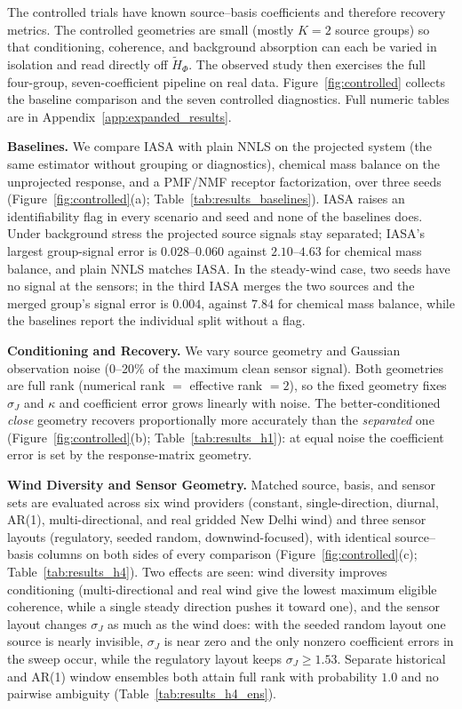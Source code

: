 The controlled trials have known source--basis coefficients and therefore recovery
metrics.  The controlled geometries are small (mostly
\(K=2\) source groups) so that conditioning, coherence, and background absorption
can each be varied in isolation and read directly off \(\widetilde H_\Phi\).  The
observed study then exercises the full four-group, seven-coefficient pipeline on
real data.  Figure~\ref{fig:controlled} collects the baseline comparison and the
seven controlled diagnostics.  Full numeric tables are in
Appendix~\ref{app:expanded_results}.


\noindent\textbf{Baselines.}
\label{subsec:results_baselines}
We compare IASA with plain NNLS on the projected system (the same estimator without
grouping or diagnostics), chemical mass balance on the unprojected response, and a
PMF/NMF receptor factorization, over three seeds (Figure~\ref{fig:controlled}(a);
Table~\ref{tab:results_baselines}).  IASA raises an identifiability flag in every
scenario and seed and none of the baselines does.  Under background stress the
projected source signals stay separated; IASA's largest group-signal error is
\(0.028\)--\(0.060\) against \(2.10\)--\(4.63\) for chemical mass balance, and plain NNLS
matches IASA.  In the steady-wind case, two seeds have no signal at the sensors; in the third
IASA merges the two sources and the merged group's signal error is \(0.004\), against
\(7.84\) for chemical mass balance, while the baselines report the individual split
without a flag.

\noindent\textbf{Conditioning and Recovery.}
\label{subsec:results_h1}
We vary source geometry and Gaussian observation noise (0--20\% of the maximum
clean sensor signal).  Both geometries are full rank (numerical rank $=$ effective
rank $=2$), so the fixed geometry fixes $\sigma_J$ and $\kappa$ and coefficient
error grows linearly with noise.  The better-conditioned \emph{close} geometry
recovers proportionally more accurately than the \emph{separated} one
(Figure~\ref{fig:controlled}(b); Table~\ref{tab:results_h1}): at equal noise the
coefficient error is set by the response-matrix geometry.

\noindent\textbf{Wind Diversity and Sensor Geometry.}
\label{subsec:results_h4}
Matched source, basis, and sensor sets are evaluated across six wind providers
(constant, single-direction, diurnal, AR(1), multi-directional, and real gridded
New Delhi wind) and three sensor layouts (regulatory, seeded random,
downwind-focused), with identical source--basis columns on both sides of every
comparison (Figure~\ref{fig:controlled}(c); Table~\ref{tab:results_h4}).  Two
effects are seen: wind diversity improves conditioning (multi-directional and real
wind give the lowest maximum eligible coherence, while a single steady direction
pushes it toward one), and the sensor layout changes $\sigma_J$ as much as the wind
does: with the seeded random layout one source is nearly invisible, $\sigma_J$ is near
zero and the only nonzero coefficient errors in the sweep occur, while the regulatory
layout keeps $\sigma_J\ge1.53$.  Separate historical and AR(1) window ensembles
both attain full rank with probability $1.0$ and no pairwise ambiguity
(Table~\ref{tab:results_h4_ens}).

